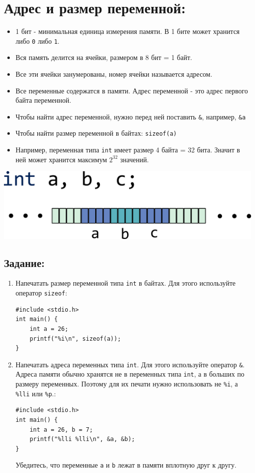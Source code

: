 \documentclass{article}
\begin{document}
\section*{Адрес и размер переменной:}
\begin{itemize}
\item 1 бит - минимальная единица измерения памяти. В 1 бите может хранится либо \texttt{0} либо \texttt{1}.
\item Вся память делится на ячейки, размером в 8 бит = 1 байт.
\item Все эти ячейки занумерованы, номер ячейки называется адресом.
\item Все переменные содержатся в памяти. Адрес переменной - это адрес первого байта переменной.
\item Чтобы найти адрес переменной, нужно перед ней поставить \texttt{\&}, например, \texttt{\&a}
\item Чтобы найти размер переменной в байтах: \texttt{sizeof(a)}
\item Например, переменная типа \texttt{int} имеет размер 4 байта = 32 бита. Значит в ней может хранится максимум $2^{32}$ значений.
\end{itemize}

\begin{center}
\includegraphics[scale=0.8]{../images/memory_ints.png}
\end{center}

\subsection*{Задание:}
\begin{enumerate}
\item Напечатать размер переменной типа \texttt{int} в байтах. Для этого используйте оператор \texttt{sizeof}:
\begin{lstlisting}[backgroundcolor = \color{solcolor}]
#include <stdio.h>
int main() {
	int a = 26;
	printf("%i\n", sizeof(a));
}
\end{lstlisting}
\item Напечатать адреса переменных типа \texttt{int}. Для этого используйте оператор \texttt{\&}. Адреса памяти обычно хранятся не в переменных типа \texttt{int}, а в больших по размеру переменных. Поэтому для их печати нужно использовать не \texttt{\%i}, а \texttt{\%lli} или \texttt{\%p}.:
\begin{lstlisting}[backgroundcolor = \color{solcolor}]
#include <stdio.h>
int main() {
	int a = 26, b = 7;
	printf("%lli %lli\n", &a, &b);
}
\end{lstlisting}
Убедитесь, что переменные \texttt{a} и \texttt{b} лежат в памяти вплотную друг к другу.
\end{enumerate}
\end{document}
